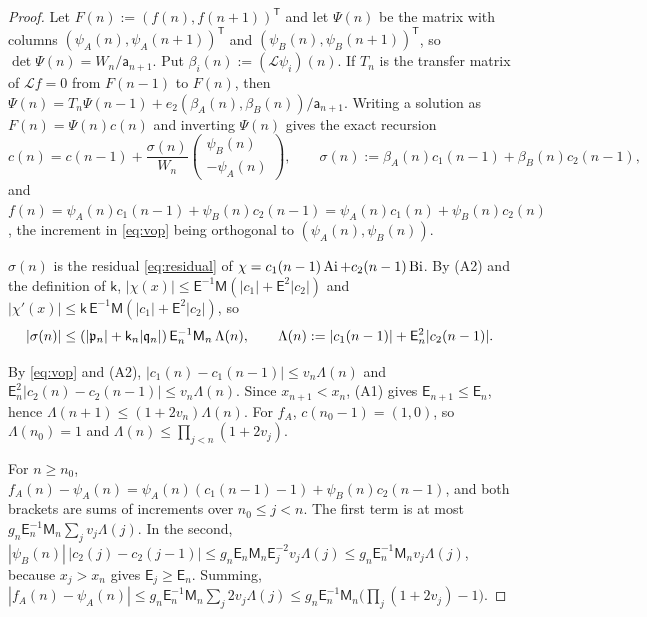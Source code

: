\begin{proof}
 Let $F(n):=(f(n),f(n+1))^{\mathsf T}$ and let $\Psi(n)$ be
the matrix with columns $(\psi_A(n),\psi_A(n+1))^{\mathsf T}$ and $(\psi_B(n),\psi_B(n+1))^{\mathsf T}$, so
$\det\Psi(n)=W_n/\mathsf a_{n+1}$. Put $\beta_i(n):=(\mathcal L\psi_i)(n)$. If $T_n$ is the transfer
matrix of $\mathcal Lf=0$ from $F(n-1)$ to $F(n)$, then
$\Psi(n)=T_n\Psi(n-1)+e_2(\beta_A(n),\beta_B(n))/\mathsf a_{n+1}$. Writing a solution as
$F(n)=\Psi(n)c(n)$ and inverting $\Psi(n)$ gives the exact recursion
\begin{equation}\label{eq:vop}
  c(n)=c(n-1)+\frac{\sigma(n)}{W_n}\begin{pmatrix}\psi_B(n)\\-\psi_A(n)\end{pmatrix},\qquad
  \sigma(n):=\beta_A(n)c_1(n-1)+\beta_B(n)c_2(n-1),
\end{equation}
and $f(n)=\psi_A(n)c_1(n-1)+\psi_B(n)c_2(n-1)=\psi_A(n)c_1(n)+\psi_B(n)c_2(n)$, the
increment in \eqref{eq:vop} being orthogonal to $(\psi_A(n),\psi_B(n))$.

 $\sigma(n)$ is the residual
\eqref{eq:residual} of $\chi=c_1(n-1)\operatorname{Ai}+c_2(n-1)\operatorname{Bi}$. By (A2) and the definition of
$\mathsf k$, $|\chi(x)|\le\mathsf E^{-1}\mathsf M(|c_1|+\mathsf E^2|c_2|)$ and
$|\chi'(x)|\le\mathsf k\,\mathsf E^{-1}\mathsf M(|c_1|+\mathsf E^2|c_2|)$, so
\[
  |\sigma(n)|\le(|\mathfrak{p}_n|+\mathsf k_n|\mathfrak{q}_n|)\,\mathsf E_n^{-1}\mathsf M_n\,\Lambda(n),\qquad
  \Lambda(n):=|c_1(n-1)|+\mathsf E_n^2|c_2(n-1)| .
\]

 By \eqref{eq:vop} and (A2), $|c_1(n)-c_1(n-1)|\le v_n\Lambda(n)$ and
$\mathsf E_n^2|c_2(n)-c_2(n-1)|\le v_n\Lambda(n)$. Since $x_{n+1}<x_n$, (A1) gives
$\mathsf E_{n+1}\le\mathsf E_n$, hence $\Lambda(n+1)\le(1+2v_n)\Lambda(n)$. For $f_A$,
$c(n_0-1)=(1,0)$, so $\Lambda(n_0)=1$ and $\Lambda(n)\le\prod_{j<n}(1+2v_j)$.

 For $n\ge n_0$,
$f_A(n)-\psi_A(n)=\psi_A(n)(c_1(n-1)-1)+\psi_B(n)c_2(n-1)$, and both brackets are sums of
increments over $n_0\le j<n$. The first term is at most
$g_n\mathsf E_n^{-1}\mathsf M_n\sum_jv_j\Lambda(j)$. In the second,
$|\psi_B(n)|\,|c_2(j)-c_2(j-1)|\le g_n\mathsf E_n\mathsf M_n\mathsf E_j^{-2}v_j\Lambda(j)\le g_n\mathsf E_n^{-1}\mathsf M_nv_j\Lambda(j)$,
because $x_j>x_n$ gives $\mathsf E_j\ge\mathsf E_n$. Summing,
$|f_A(n)-\psi_A(n)|\le g_n\mathsf E_n^{-1}\mathsf M_n\sum_j2v_j\Lambda(j)
\le g_n\mathsf E_n^{-1}\mathsf M_n\bigl(\prod_j(1+2v_j)-1\bigr)$.


\end{proof}
